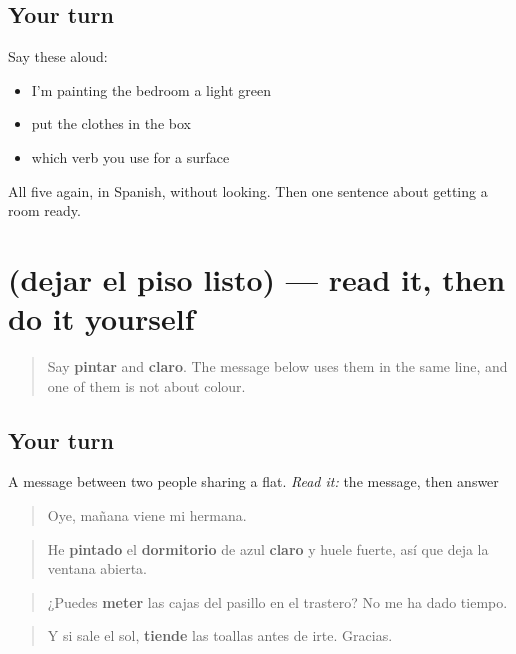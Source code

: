 \subsection*{Your turn}
Say these aloud:

\begin{itemize}
\raggedright
  \item I'm painting the bedroom a light green
  \item put the clothes in the box
  \item which verb you use for a surface
\end{itemize}

\begin{tcolorbox}[breakable,colback=teal!4,colframe=teal!35!black,title={Before you move on}]
All five again, in Spanish, without looking. Then one sentence about getting a room ready.
\end{tcolorbox}
\section[Practice]{(dejar el piso listo) — read it, then do it yourself}

\label{lesson:ES-C455-sintesis-cuarto}



\begin{quote}
Say \textbf{pintar} and \textbf{claro}. The message below uses them in the same line, and one of them is not about colour.
\end{quote}

\subsection*{Your turn}
A message between two people sharing a flat. \emph{Read it:} the message, then answer

\begin{quote}
Oye, mañana viene mi hermana.
\end{quote}

\begin{quote}
He \textbf{pintado} el \textbf{dormitorio} de azul \textbf{claro} y huele fuerte, así que deja la ventana abierta.
\end{quote}

\begin{quote}
¿Puedes \textbf{meter} las cajas del pasillo en el trastero? No me ha dado tiempo.
\end{quote}

\begin{quote}
Y si sale el sol, \textbf{tiende} las toallas antes de irte. Gracias.
\end{quote}

